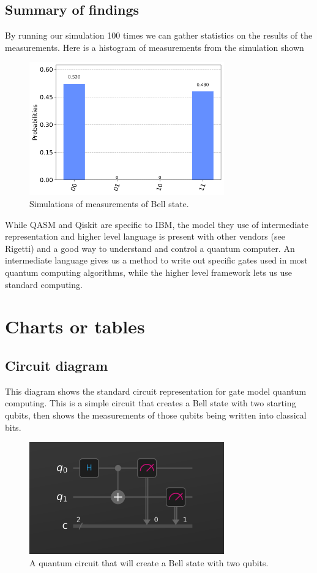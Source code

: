 \documentclass{article}
\begin{document}
\subsection{Summary of findings}
By running our simulation 100 times we can gather statistics on the results of the measurements. Here is a histogram of measurements from the simulation shown

\begin{figure}[H]
    \centering
    \includegraphics[width=0.75\textwidth]{histogram.png}
    \caption{Simulations of measurements of Bell state.}
\end{figure}

While QASM and Qiskit are specific to IBM, the model they use of intermediate representation and higher level language is present with other vendors (see Rigetti) and a good way to understand and control a quantum computer. An intermediate language gives us a method to write out specific gates used in most quantum computing algorithms, while the higher level framework lets us use standard computing. 



\section{Charts or tables}
\subsection{Circuit diagram}
This diagram shows the standard circuit representation for gate model quantum computing. This is a simple circuit that creates a Bell state with two starting qubits, then shows the measurements of those qubits being written into classical bits.
\begin{figure}[H]
    \centering
    \includegraphics[width=0.75\textwidth]{circuit.png}
    \caption{A quantum circuit that will create a Bell state with two qubits.}
\end{figure}
\end{document}
